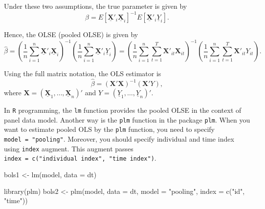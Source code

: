 \documentclass[
  12pt,
]{article}
\newenvironment{Shaded}{\begin{snugshade}}{\end{snugshade}}
\newcommand{\AttributeTok}[1]{\textcolor[rgb]{0.77,0.63,0.00}{#1}}
\newcommand{\FunctionTok}[1]{\textcolor[rgb]{0.00,0.00,0.00}{#1}}
\newcommand{\NormalTok}[1]{#1}
\newcommand{\OtherTok}[1]{\textcolor[rgb]{0.56,0.35,0.01}{#1}}
\newcommand{\StringTok}[1]{\textcolor[rgb]{0.31,0.60,0.02}{#1}}
\begin{document}
Under these two assumptions, the true parameter is given by \[
  \beta = E[\underline{\mathbf{X}}'_i\underline{\mathbf{X}}_i]^{-1} E[\underline{\mathbf{X}}'_i\underline{Y}_i].
\]

Hence, the OLSE (pooled OLSE) is given by \[
  \hat{\beta} 
  = \left( \frac{1}{n} \sum_{i=1}^n \underline{\mathbf{X}}'_i\underline{\mathbf{X}}_i \right)^{-1}
  \left( \frac{1}{n} \sum_{i=1}^n \underline{\mathbf{X}}'_i\underline{Y}_i \right)
  = \left( \frac{1}{n} \sum_{i=1}^n \sum_{t=1}^T \mathbf{X}'_{it} \mathbf{X}_{it} \right)^{-1}
  \left( \frac{1}{n} \sum_{i=1}^n \sum_{t=1}^T \mathbf{X}'_{it} Y_{it} \right).
\]

Using the full matrix notation, the OLS estimator is \[
  \hat{\beta} = (\mathbf{X}' \mathbf{X})^{-1} (\mathbf{X}' Y),
\] where
\(\mathbf{X} = (\underline{\mathbf{X}}_1, \ldots, \underline{\mathbf{X}}_n)'\)
and \(Y = (\underline{Y}_1, \ldots, \underline{Y}_n)'\).

In \texttt{R} programming, the \texttt{lm} function provides the pooled
OLSE in the context of panel data model. Another way is the \texttt{plm}
function in the package \texttt{plm}. When you want to estimate pooled
OLS by the \texttt{plm} function, you need to specify
\texttt{model\ =\ "pooling"}. Moreover, you should specify individual
and time index using \texttt{index} augment. This augment passes
\texttt{index\ =\ c("individual\ index",\ "time\ index")}.

\begin{Shaded}
\begin{Highlighting}[]
\NormalTok{bols1 }\OtherTok{\textless{}{-}} \FunctionTok{lm}\NormalTok{(model, }\AttributeTok{data =}\NormalTok{ dt)}

\FunctionTok{library}\NormalTok{(plm)}
\NormalTok{bols2 }\OtherTok{\textless{}{-}} \FunctionTok{plm}\NormalTok{(model, }\AttributeTok{data =}\NormalTok{ dt, }\AttributeTok{model =} \StringTok{"pooling"}\NormalTok{, }\AttributeTok{index =} \FunctionTok{c}\NormalTok{(}\StringTok{"id"}\NormalTok{, }\StringTok{"time"}\NormalTok{))}
\end{Highlighting}
\end{Shaded}
\end{document}
